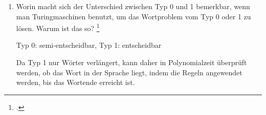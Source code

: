 \documentclass{lehramt-informatik-aufgabe}
\begin{document}
\begin{enumerate}
\item Worin macht sich der Unterschied zwischen Typ 0 und 1 bemerkbar,
wenn man Turingmaschinen benutzt, um das Wortproblem vom Typ 0 oder 1 zu
lösen. Warum ist das so?
\footcite[Aufgabe 5b)]{theo:ab:5}

\begin{liAntwort}
Typ 0: semi-entscheidbar, Typ 1: entscheidbar

Da Typ 1 nur Wörter verlängert, kann daher in Polynomialzeit überprüft
werden, ob das Wort in der Sprache liegt, indem die Regeln angewendet
werden, bis das Wortende erreicht ist.
\end{liAntwort}

\end{enumerate}
\end{document}
